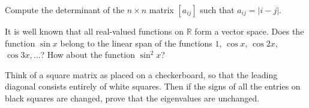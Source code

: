 \documentclass{article}
\begin{document}
Compute the determinant of the \(n \times  n\) matrix \(\left[a_{i j}\right]\) such that \(a_{i j} =|i-j|\).

It is well known that all real-valued functions on \(\mathbb{R}\) form a vector space. Does the function \(\sin  x\) belong to the linear span of
the functions \(1\), \(\cos  x\), \(\cos  2 x\), \(\cos  3 x,\ldots\)? { } { } { } How about the function \(\sin ^2 x\)?

Think of a square matrix as placed on a checkerboard, so that the leading diagonal consists entirely of white squares. Then if the signs of all the
entries on black squares are changed, prove that the eigenvalues are unchanged.
\end{document}
